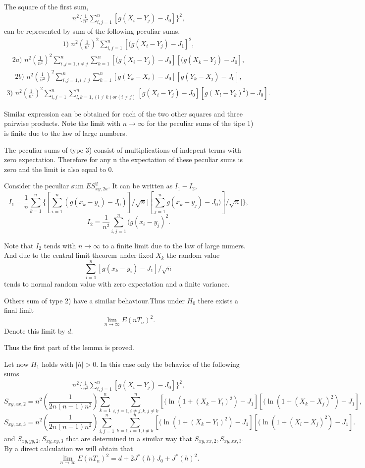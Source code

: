 \documentclass{svproc}
\begin{document}
The square of the first sum,
\begin{eqnarray*}
n^2 \{\frac{1}{n^2}\sum_{i,j=1}^n [g(X_i - Y_j)-J_0]\}^2,
\end{eqnarray*}
can be represented by sum of the following peculiar sums.
\begin{eqnarray*}
1)\,\,n^2 (\frac{1}{n^2})^2 \sum_{i,j=1}^n [(g(X_i - Y_j) -J_1]^2,
\end{eqnarray*}
\begin{eqnarray*}
2a)\,\,n^2(\frac{1}{n^2})^2 \sum_{i,j=1,i \ne j}^n\sum_{k=1}^n [(g(X_i - Y_j)-J_0][(g(X_k - Y_j)-J_0],
\end{eqnarray*}
\begin{eqnarray*}
2b)\,\,n^2(\frac{1}{n^2})^2 \sum_{i,j=1,i \ne j}^n\sum_{k=1}^n [g(Y_k - X_i)-J_0][g (Y_k - X_j)-J_0],
\end{eqnarray*}
\begin{eqnarray*}
3)\,\, n^2 (\frac{1}{n^2})^2 \sum_{i,j=1}^n\sum_{{l,k=1}, (l \ne  k)or(i\ne j)}^n  [g (X_i - Y_j)-J_0][g(X_l - Y_k)^2)-J_0].
\end{eqnarray*}

Similar expression can be obtained for each of the two other squares and three  pairwise
products.
Note the limit with $n \to \infty$ for the peculiar sums of the tipe 1) is finite due to the law of large numbers.

The peculiar sums of type 3) consist of multiplications of indepent terms with zero expectation. Therefore for any n the expectation of these peculiar sums is zero and the limit is also equal to 0.

Consider the peculiar sum $ES^2_{xy,2a}.$  It can be written as $I_1 - I_2$,
$$
I_1=\frac{1}{n}\sum_{k=1}^n \{[\sum_{i=1}^n
(g(x_k-y_i)-J_0)]/\sqrt{n}][\sum_{j=1}^n
g(x_k-y_j)-J_0)]/\sqrt{n}]\},
$$
$$
I_2= \frac {1}{n^2}\sum_{i,j=1}^n(g(x_i-y_j)^2.
$$

Note that $I_2$ tends with $n \to \infty$ to a finite limit due to the law of large numers. And
due to the central limit theorem
under fixed  $X_k$ the random value
$$
\sum_{i=1}^n
[g(x_k-y_i)-J_1]/\sqrt{n}
$$
tends to normal random value with zero expectation and a finite variance.

Others sum of type 2) have a similar behaviour.Thus under $H_0$  there exists a final limit
$$
\lim_{n \to \infty}E(nT_n)^2.
$$
Denote this limit by $d$.

Thus the first part of the lemma is proved.

Let now $H_1$ holds with
$|h|>0$. In this case only the behavior of the following sums
\begin{eqnarray*}
n^2 \{\frac{1}{n^2}\sum_{i,j=1}^n [g(X_i - Y_j)-J_0]\}^2,
\end{eqnarray*}
$$
S_{xy,xx,2}=n^2 (\frac{1}{2n(n-1)n^2})\sum_{k=1}^n \sum_{i,j=1, i\ne j,k, j\ne k}^n[(\ln(1 + (X_k - Y_i)^2)-J_1][(\ln(1 + (X_k - X_j)^2)-J_1],
$$
$$
S_{xy,xx,3}=n^2 (\frac{1}{2n(n-1)n^2})\sum_{i,j=1}^n\sum_{k=1,l=1,l \ne k}^n [(\ln(1 + (X_k - Y_i)^2)-J_1][(\ln(1 + (X_l - X_j)^2)-J_1].
$$
and $S_{xy,yy,2},S_{xy,xy,3}$ that are determined in a similar way that  $S_{xy,xx,2},S_{xy,xx,3}$.
By a direct calculation we will obtain that
$$
\lim_{n \to \infty}E(nT_n)^2=
d + 2J^*(h)J_0 + J^*(h)^2.
$$
\end{document}
